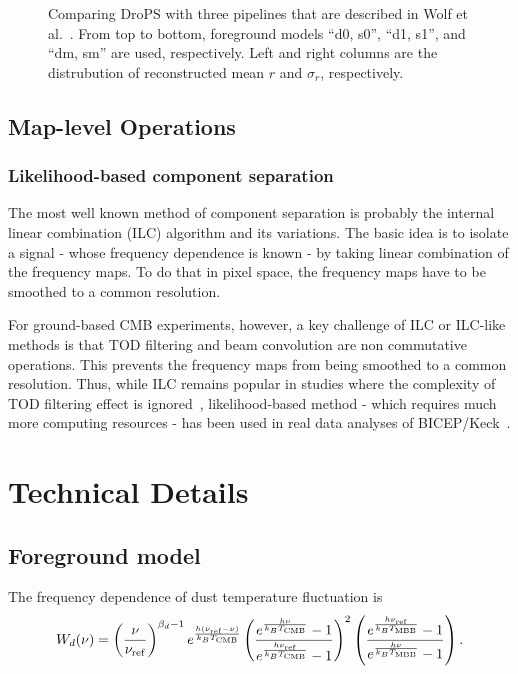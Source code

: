 \documentclass[12pt, a4paper]{ctexart} %
\begin{document}
\begin{figure}
  \caption{Comparing DroPS with three pipelines that are described in Wolf et al.~\cite{SO-SAT}. From top to bottom, foreground models ``d0, s0'', ``d1, s1'', and ``dm, sm'' are used, respectively. Left and right columns are the distrubution of reconstructed mean $r$ and $\sigma_r$, respectively.\label{fig:compare_SO}}
\end{figure}

\subsection{Map-level Operations}

\subsubsection{Likelihood-based component separation}
The most well known method of component separation is probably the internal linear combination (ILC) algorithm and its variations. The basic idea is to isolate a signal - whose frequency dependence is known - by taking linear combination of the frequency maps. To do that in pixel space, the frequency maps have to be smoothed to a common resolution. 

For ground-based CMB experiments, however, a key challenge of ILC or ILC-like methods is that TOD filtering and beam convolution are non commutative operations. This prevents the frequency maps from being smoothed to a common resolution. Thus, while ILC remains popular in studies where the complexity of TOD filtering effect is ignored~\cite{SO-SAT}, likelihood-based method - which requires much more computing resources - has been used in real data analyses of BICEP/Keck~\cite{BKmap}.




\section{Technical Details}

\subsection{Foreground model}

The frequency dependence of dust temperature fluctuation is
\begin{equation}
  W_d(\nu) = \left(\frac{\nu}{\nu_{\rm ref}}\right)^{\beta_d-1}e^{\frac{h(\nu_{\rm ref} - \nu)}{k_BT_{\rm CMB}}}\left(\frac{e^{\frac{h\nu}{k_BT_{\rm CMB}}}-1}{e^{\frac{h\nu_{\rm ref}}{k_BT_{\rm CMB}}}-1}\right)^2 \left(\frac{e^{\frac{h\nu_{\rm ref}}{k_BT_{\rm MBB}}}-1}{e^{\frac{h\nu}{k_BT_{\rm MBB}}}-1}\right). \label{eq:dust_w}
\end{equation}
\end{document}
